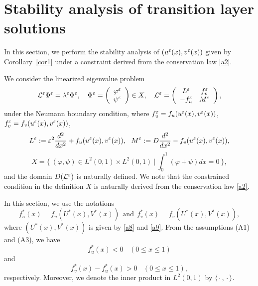 \documentclass[a4,10pt]{article}
\begin{document}
\section{Stability analysis of transition layer solutions} \label{stability} 

In this section, we perform the stability analysis of $(u^\varepsilon(x), v^\varepsilon(x))$ given by
Corollary~\ref{cor1} under a constraint derived from 
the conservation law \eqref{a2}.

We consider the linearized eigenvalue problem
%
\begin{equation}\label{c1}
\mathcal{L}^\ep \Phi^\ep = \lambda^\ep \Phi^\ep, \ \ \
%
\Phi^\ep = 
\left(
\begin{array}{c}
\varphi^\ep \\
\psi^\ep
\end{array}
\right) \in X, 
%
\ \ \
\mathcal{L}^\ep =
\left(
\begin{array}{cc}
L^\ep & f_v^\ep \\
- f_u^\ep & M^\ep
\end{array}
\right),
\end{equation}
%
under the Neumann boundary condition, where 
$f_u^\varepsilon = f_u ( u^\varepsilon(x), v^\varepsilon(x) )$, 
$f_v^\varepsilon = f_v ( u^\varepsilon(x), v^\varepsilon(x) )$, 
%
\[
L^\ep := \ep^2 \dis\frac{d^2}{dx^2} + f_u ( u^\ep(x), v^\ep(x) ), \ \ 
M^\ep := D \dis\frac{d^2}{dx^2} - f_v ( u^\ep(x), v^\ep(x) ),
\]
%
%
\begin{equation}\label{c2}
X = \{ \ (\varphi, \psi) \in L^2(0, 1) \times L^2(0, 1) \ | \ \int_0^1 (\varphi + \psi) dx = 0 \ \},
\end{equation}
%
and the domain $D(\mathcal{L}^\varepsilon)$ is naturally defined. 
We note that the constrained condition in the definition $X$ is naturally 
derived from the conservation law \eqref{a2}.

In this section, we use the notations
%
\begin{equation}\label{c2xx}
f_u^*(x) = f_u( U^*(x), V^*(x)) \ \ 
\text{and} \ \ 
f_v^*(x) = f_v( U^*(x), V^*(x)),
\end{equation}
%
where $(U^*(x), V^*(x))$ is given by \eqref{a8} and \eqref{a9}. 
From the assumptions (A1) and (A3), we have
%
\begin{equation}\label{fa1}
f_u^*(x) < 0 \ \  \ \ ( 0 \leq x \leq 1)
\end{equation}
%
and
%
\begin{equation}\label{fa2}
f_v^*(x) - f_u^*(x) > 0 \ \  \ \ ( 0 \leq x \leq 1),
\end{equation}
%
respectively. Moreover, we denote the inner product in 
$L^2(0,1)$ by $\langle \, \cdot \, , \, \cdot \, \rangle$.
\end{document}
